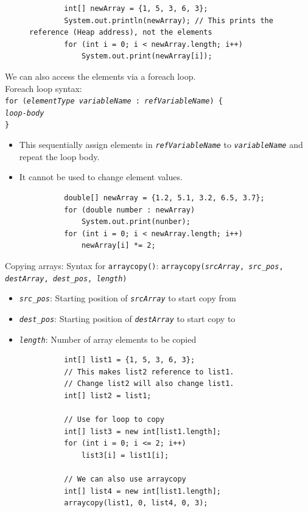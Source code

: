 \documentclass{article}
\begin{document}
\begin{figure}[h!]
	\centering
	\begin{verbatim}
		int[] newArray = {1, 5, 3, 6, 3};
		System.out.println(newArray); // This prints the reference (Heap address), not the elements
		for (int i = 0; i < newArray.length; i++)
		    System.out.print(newArray[i]);
	\end{verbatim}
\end{figure}

We can also access the elements via a foreach loop.\\
Foreach loop syntax:\\
\texttt{for (\textit{elementType} \textit{variableName} : \textit{refVariableName}) \{\\
\hspace*{2em}\textit{loop-body}\\
\}}
\begin{itemize}
	\item This sequentially assign elements in \texttt{\textit{refVariableName}} to \texttt{\textit{variableName}} and repeat the loop body.
	\item It cannot be used to change element values.
\end{itemize}

\begin{figure}[h!]
	\centering
	\begin{verbatim}
		double[] newArray = {1.2, 5.1, 3.2, 6.5, 3.7};
		for (double number : newArray)
		    System.out.print(nunber);
		for (int i = 0; i < newArray.length; i++)
		    newArray[i] *= 2;
	\end{verbatim}
\end{figure}
\newpage

Copying arrays:
Syntax for \texttt{arraycopy()}: \texttt{arraycopy(\textit{srcArray}, \textit{src\_pos}, \textit{destArray}, \textit{dest\_pos}, \textit{length})}
\begin{itemize}
	\item \texttt{\textit{src\_pos}}: Starting position of \texttt{\textit{srcArray}} to start copy from
	\item \texttt{\textit{dest\_pos}}: Starting position of \texttt{\textit{destArray}} to start copy to
	\item \texttt{\textit{length}}: Number of array elements to be copied
\end{itemize}

\begin{figure}[h]
	\centering
	\begin{verbatim}
		int[] list1 = {1, 5, 3, 6, 3};
		// This makes list2 reference to list1.
		// Change list2 will also change list1.
		int[] list2 = list1;
		
		// Use for loop to copy
		int[] list3 = new int[list1.length];
		for (int i = 0; i <= 2; i++)
		    list3[i] = list1[i];
		
		// We can also use arraycopy
		int[] list4 = new int[list1.length];
		arraycopy(list1, 0, list4, 0, 3);
	\end{verbatim}
\end{figure}
\end{document}
